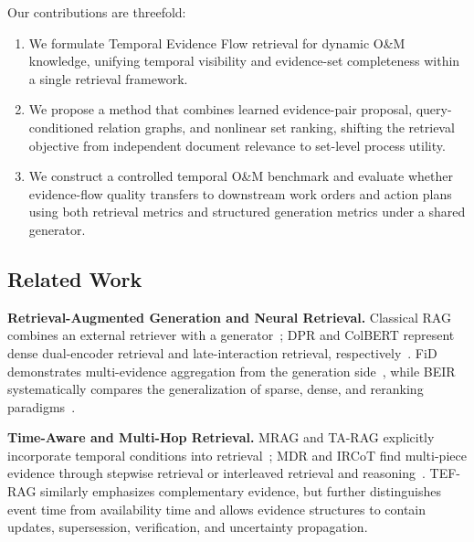 Our contributions are threefold:
\begin{enumerate}
    \item We formulate Temporal Evidence Flow retrieval for dynamic O\&M knowledge, unifying temporal visibility and evidence-set completeness within a single retrieval framework.
    \item We propose a method that combines learned evidence-pair proposal, query-conditioned relation graphs, and nonlinear set ranking, shifting the retrieval objective from independent document relevance to set-level process utility.
    \item We construct a controlled temporal O\&M benchmark and evaluate whether evidence-flow quality transfers to downstream work orders and action plans using both retrieval metrics and structured generation metrics under a shared generator.
\end{enumerate}

\subsection{Related Work}
\label{sec:related_work}

\textbf{Retrieval-Augmented Generation and Neural Retrieval.}
Classical RAG combines an external retriever with a generator~\cite{lewis2020rag}; DPR and ColBERT represent dense dual-encoder retrieval and late-interaction retrieval, respectively~\cite{karpukhin2020dpr,khattab2020colbert}. FiD demonstrates multi-evidence aggregation from the generation side~\cite{izacard2021fid}, while BEIR systematically compares the generalization of sparse, dense, and reranking paradigms~\cite{thakur2021beir}. 

\textbf{Time-Aware and Multi-Hop Retrieval.}
MRAG and TA-RAG explicitly incorporate temporal conditions into retrieval~\cite{zhang2025mrag,lau2025tarag}; MDR and IRCoT find multi-piece evidence through stepwise retrieval or interleaved retrieval and reasoning~\cite{xiong2021mdr,trivedi2023ircot}. TEF-RAG similarly emphasizes complementary evidence, but further distinguishes event time from availability time and allows evidence structures to contain updates, supersession, verification, and uncertainty propagation.

